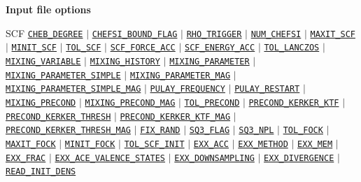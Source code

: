 \begin{frame}[allowframebreaks]{\textbf{Input file options}}
  \begin{block}{SCF}
  \hyperlink{CHEB_DEGREE}{\texttt{CHEB\_DEGREE}} $\vert$
  \hyperlink{CHEFSI_BOUND_FLAG}{\texttt{CHEFSI\_BOUND\_FLAG}} $\vert$
  \hyperlink{RHO_TRIGGER}{\texttt{RHO\_TRIGGER}} $\vert$
  \hyperlink{NUM_CHEFSI}{\texttt{NUM\_CHEFSI}} $\vert$
  \hyperlink{MAXIT_SCF}{\texttt{MAXIT\_SCF}} $\vert$
  \hyperlink{MINIT_SCF}{\texttt{MINIT\_SCF}} $\vert$
  \hyperlink{TOL_SCF}{\texttt{TOL\_SCF}} $\vert$
  \hyperlink{SCF_FORCE_ACC}{\texttt{SCF\_FORCE\_ACC}} $\vert$
  \hyperlink{SCF_ENERGY_ACC}{\texttt{SCF\_ENERGY\_ACC}} $\vert$
  \hyperlink{TOL_LANCZOS}{\texttt{TOL\_LANCZOS}} $\vert$
  \hyperlink{MIXING_VARIABLE}{\texttt{MIXING\_VARIABLE}} $\vert$
  \hyperlink{MIXING_HISTORY}{\texttt{MIXING\_HISTORY}} $\vert$
  \hyperlink{MIXING_PARAMETER}{\texttt{MIXING\_PARAMETER}} $\vert$
  \hyperlink{MIXING_PARAMETER_SIMPLE}{\texttt{MIXING\_PARAMETER\_SIMPLE}} $\vert$
  \hyperlink{MIXING_PARAMETER_MAG}{\texttt{MIXING\_PARAMETER\_MAG}} $\vert$
  \hyperlink{MIXING_PARAMETER_SIMPLE_MAG}{\texttt{MIXING\_PARAMETER\_SIMPLE\_MAG}} $\vert$
  \hyperlink{PULAY_FREQUENCY}{\texttt{PULAY\_FREQUENCY}} $\vert$
  \hyperlink{PULAY_RESTART}{\texttt{PULAY\_RESTART}} $\vert$
  \hyperlink{MIXING_PRECOND}{\texttt{MIXING\_PRECOND}} $\vert$
  \hyperlink{MIXING_PRECOND_MAG}{\texttt{MIXING\_PRECOND\_MAG}} $\vert$
  \hyperlink{TOL_PRECOND}{\texttt{TOL\_PRECOND}} $\vert$
  \hyperlink{PRECOND_KERKER_KTF}{\texttt{PRECOND\_KERKER\_KTF}} $\vert$
  \hyperlink{PRECOND_KERKER_THRESH}{\texttt{PRECOND\_KERKER\_THRESH}} $\vert$
  \hyperlink{PRECOND_KERKER_KTF_MAG}{\texttt{PRECOND\_KERKER\_KTF\_MAG}} $\vert$
  \hyperlink{PRECOND_KERKER_THRESH_MAG}{\texttt{PRECOND\_KERKER\_THRESH\_MAG}} $\vert$
  \hyperlink{FIX_RAND}{\texttt{FIX\_RAND}} $\vert$ 
  \hyperlink{SQ3_FLAG}{\texttt{SQ3\_FLAG}} $\vert$ 
  \hyperlink{SQ3_NPL}{\texttt{SQ3\_NPL}} $\vert$ 
  \hyperlink{TOL_FOCK}{\texttt{TOL\_FOCK}} $\vert$ 
  \hyperlink{MAXIT_FOCK}{\texttt{MAXIT\_FOCK}} $\vert$ 
  \hyperlink{MINIT_FOCK}{\texttt{MINIT\_FOCK}} $\vert$ 
  \hyperlink{TOL_SCF_INIT}{\texttt{TOL\_SCF\_INIT}} $\vert$ 
  \hyperlink{EXX_ACC}{\texttt{EXX\_ACC}} $\vert$ 
  \hyperlink{EXX_METHOD}{\texttt{EXX\_METHOD}} $\vert$ 
  \hyperlink{EXX_MEM}{\texttt{EXX\_MEM}} $\vert$ 
  \hyperlink{EXX_FRAC}{\texttt{EXX\_FRAC}} $\vert$ 
  \hyperlink{EXX_ACE_VALENCE_STATES}{\texttt{EXX\_ACE\_VALENCE\_STATES}} $\vert$ 
  \hyperlink{EXX_DOWNSAMPLING}{\texttt{EXX\_DOWNSAMPLING}} $\vert$ 
  \hyperlink{EXX_DIVERGENCE}{\texttt{EXX\_DIVERGENCE}} $\vert$ 
  \hyperlink{READ_INIT_DENS}{\texttt{READ\_INIT\_DENS}} 
  \end{block}
  

\end{frame}
